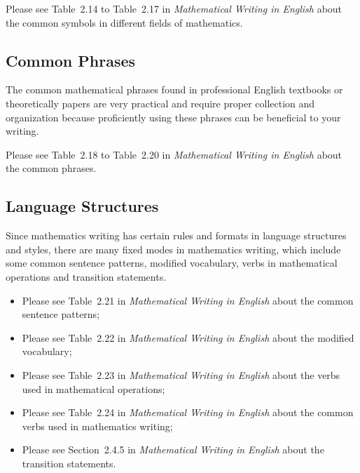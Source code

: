 Please see Table~2.14 to Table~2.17 in \emph{Mathematical Writing in English}\cite{2013数学之英文写作} about the common symbols in different fields of mathematics.


\subsection{Common Phrases}
The common mathematical phrases found in professional English textbooks or theoretically papers are very practical and require proper collection and organization because proficiently using these phrases can be beneficial to your writing.

Please see Table~2.18 to Table~2.20 in \emph{Mathematical Writing in English}\cite{2013数学之英文写作} about the common phrases.


\subsection{Language Structures}
Since mathematics writing has certain rules and formats in language structures and styles, there are many fixed modes in mathematics writing, which include some common sentence patterns, modified vocabulary, verbs in mathematical operations and transition statements.
\begin{itemize}[label={\dag}]
	\item Please see Table~2.21 in \emph{Mathematical Writing in English}\cite{2013数学之英文写作} about the common sentence patterns;
	\item Please see Table~2.22 in \emph{Mathematical Writing in English}\cite{2013数学之英文写作} about the modified vocabulary;
	\item Please see Table~2.23 in \emph{Mathematical Writing in English}\cite{2013数学之英文写作} about the verbs used in mathematical operations;
	\item Please see Table~2.24 in \emph{Mathematical Writing in English}\cite{2013数学之英文写作} about the common verbs used in mathematics writing;
	\item Please see Section~2.4.5 in \emph{Mathematical Writing in English}\cite{2013数学之英文写作} about the transition statements.
\end{itemize}



\nocite{2013数学之英文写作,Nicholas1998Handbook}

